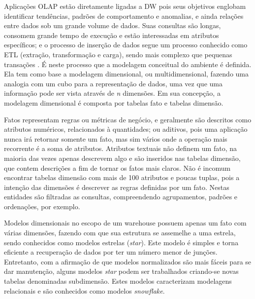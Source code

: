 \documentclass[12pt]{article}
\begin{document}
Aplicações OLAP estão diretamente ligadas a DW pois seus objetivos englobam identificar tendências, 
padrões de comportamento e anomalias, e ainda relações entre dados \cite{codd1998providing} sob um grande 
volume de dados. Suas consultas são longas, consomem grande tempo de execução e estão interessadas em 
atributos específicos; e o processo de inserção de dados segue um processo conhecido como ETL (extração, transformação e carga), 
sendo mais complexo que pequenas transações \cite{vertabelo2017olap}. É neste processo que a modelagem conceitual do ambiente é definida. 
Ela tem como base a modelagem dimensional, ou multidimensional, fazendo uma analogia com um cubo para 
a representação de dados, uma vez que uma informação pode ser vista através de \textit{n} dimensões. 
Em sua concepção, a modelagem dimensional é composta por tabelas fato e tabelas dimensão.

Fatos representam regras ou métricas de negócio, e geralmente são descritos como atributos 
numéricos, relacionados à quantidades; ou aditivos, pois uma aplicação nunca irá retornar somente um fato, 
mas sim vários onde a operação mais recorrente é a soma de atributos.
Atributos textuais não definem um fato, na maioria das vezes apenas descrevem algo e são inseridos 
nas tabelas dimensão, que contem descrições a fim de tornar os fatos mais claros. Não é incomum encontrar tabelas dimensão  
com mais de 100 atributos e poucas tuplas, pois a intenção das dimensões é descrever as regras definidas por um 
fato. Nestas entidades são filtradas as consultas, compreendendo agrupamentos, padrões e ordenações, por exemplo.

Modelos dimensionais no escopo de um warehouse possuem apenas um fato com várias dimensões, fazendo com que 
sua estrutura se assemelhe a uma estrela, sendo conhecidos como modelos estrelas (\textit{star}). Este modelo é 
simples e torna eficiente a recuperação de dados por ter um número menor de junções. Entretanto, com a afirmação de 
que modelos normalizados são mais fáceis para se dar manutenção, alguns modelos \textit{star} podem ser trabalhados 
criando-se novas tabelas denominadas subdimensão. Estes modelos caracterizam modelagens relacionais e são conhecidos 
como modelos \textit{snowflake}.
\end{document}
